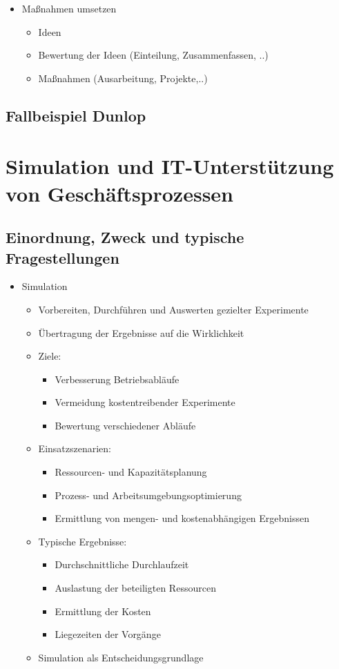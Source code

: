 \begin{itemize}
\item Maßnahmen umsetzen
	\begin{itemize}
	\item Ideen 
	\item Bewertung der Ideen (Einteilung, Zusammenfassen, ..)
	\item Maßnahmen (Ausarbeitung, Projekte,..)
	\end{itemize}
\end{itemize}

\subsection{Fallbeispiel Dunlop}

\section{Simulation und IT-Unterstützung von Geschäftsprozessen}
\subsection{Einordnung, Zweck und typische Fragestellungen}
\begin{itemize}
\item Simulation
	\begin{itemize}
	\item Vorbereiten, Durchführen und Auswerten gezielter Experimente
	\item Übertragung der Ergebnisse auf die Wirklichkeit
	\item Ziele:
		\begin{itemize}
		\item Verbesserung Betriebsabläufe
		\item Vermeidung kostentreibender Experimente
		\item Bewertung verschiedener Abläufe
		\end{itemize}
	\item Einsatzszenarien: 
		\begin{itemize}
		\item Ressourcen- und Kapazitätsplanung
		\item Prozess- und Arbeitsumgebungsoptimierung
		\item  Ermittlung von mengen- und kostenabhängigen Ergebnissen
		\end{itemize}
	\item Typische Ergebnisse:
		\begin{itemize}
		\item Durchschnittliche Durchlaufzeit
		\item Auslastung der beteiligten Ressourcen 
		\item Ermittlung der Kosten
		\item Liegezeiten der Vorgänge
		\end{itemize}
	\item Simulation als Entscheidungsgrundlage
	\end{itemize}
\end{itemize}

